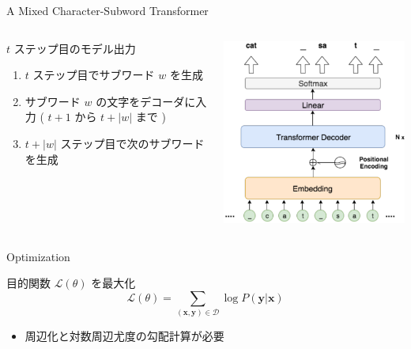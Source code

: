 \documentclass[unicode, 12pt, aspectratio=43]{beamer}
\begin{document}
\begin{frame}[label={sec:org70502e6}]{A Mixed Character-Subword Transformer}
\begin{columns}
\begin{column}{0.65\columnwidth}
\begin{block}{\(t\) ステップ目のモデル出力}
\begin{enumerate}
\item \(t\) ステップ目でサブワード \(w\) を生成
\item サブワード \(w\) の文字をデコーダに入力 ( \(t+1\) から \(t+|w|\) まで )
\item \(t+|w|\) ステップ目で次のサブワードを生成
\end{enumerate}
\end{block}
\end{column}

\begin{column}{0.35\columnwidth}
\begin{center}
\includegraphics[width=\linewidth]{./figure/Figure2.pdf}
\end{center}
\end{column}
\end{columns}
\end{frame}

\begin{frame}[label={sec:org6b1f2eb}]{Optimization}
\begin{block}{目的関数 \(\mathcal{L}(\theta)\) を最大化}
\begin{equation*}
  \mathcal{L}(\theta) = \sum_{(\boldsymbol{x}, \boldsymbol{y}) \in \mathcal{D}} \log P(\boldsymbol{y} | \boldsymbol{x})
\end{equation*}
\begin{itemize}
\item 周辺化と対数周辺尤度の勾配計算が必要
\end{itemize}
\end{block}
\end{frame}
\end{document}
